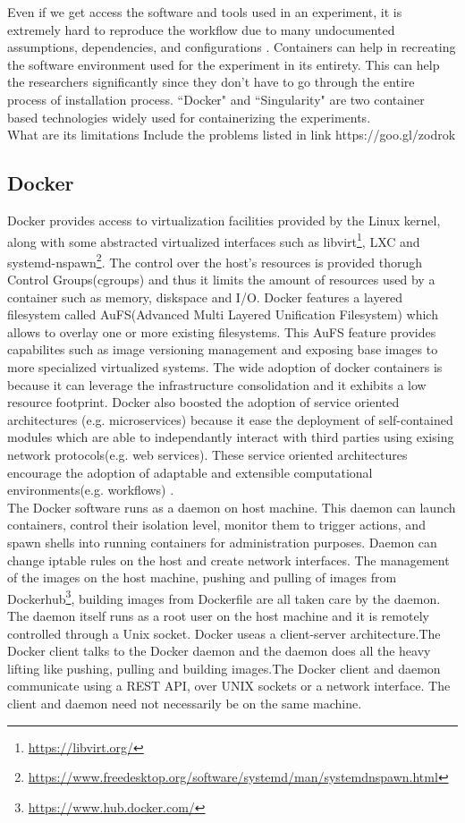 Even if we get access the software and tools used in an experiment, it is extremely hard to reproduce the workflow due to many undocumented assumptions, dependencies, and configurations \cite{7883438}. Containers can help in recreating the software environment used for the experiment in its entirety. This can help the researchers significantly since they don't have to go through the entire process of installation process. ``Docker" and ``Singularity" are two container based technologies widely used for containerizing the experiments.\\


What are its limitations
Include the problems listed in link https://goo.gl/zodrok

\subsection{Docker}
Docker provides access to virtualization facilities provided by the Linux kernel, along with some abstracted virtualized interfaces such as libvirt\footnote{\url{https://libvirt.org/}}, LXC and systemd-nspawn\footnote{\url{https://www.freedesktop.org/software/systemd/man/systemdnspawn.html}}. The control over the host's resources is provided thorugh Control Groups(cgroups) and thus it limits the amount of resources used by a container such as memory, diskspace and I/O. Docker features a layered filesystem called AuFS(Advanced Multi Layered Unification Filesystem) which allows to overlay one or more existing filesystems. This AuFS feature provides capabilites such as image versioning management and exposing base images to more specialized virtualized systems. The wide adoption of docker containers is because it can leverage the infrastructure consolidation and it exhibits a low resource footprint. Docker also boosted the adoption of service oriented architectures (e.g. microservices) because it ease the deployment of self-contained modules which are able to independantly interact with third parties using exising network protocols(e.g. web services). These service oriented architectures encourage the adoption of adaptable and extensible computational environments(e.g. workflows) \cite{Xavier:2013:PEC:2497369.2497577}. \\

The Docker software runs as a daemon on host machine. This daemon can launch containers, control their isolation level, monitor them to trigger actions, and spawn shells into running containers for administration purposes. Daemon can change iptable rules on the host and create network interfaces. The management of the images on the host machine, pushing and pulling of images from Dockerhub\footnote{\url{https://www.hub.docker.com/}}, building images from Dockerfile are all taken care by the daemon. The daemon itself runs as a root user on the host machine and it is remotely controlled through a Unix socket. Docker useas a client-server architecture.The Docker client talks to the Docker daemon and the daemon does all the heavy lifting like pushing, pulling and building images.The Docker client and daemon communicate using a REST API, over UNIX sockets or a network interface. The client and daemon need not necessarily be on the same machine\cite{docker-documentation}.

